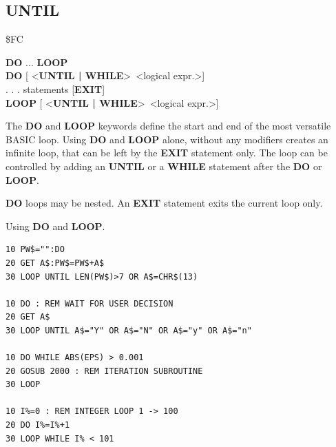 
\newpage
\subsection{UNTIL}
\begin{description}[leftmargin=2cm,style=nextline]
\item [Token:] \$FC
\item [Format:] {\bf DO} ... {\bf LOOP} \\
                {\bf DO} [ <{\bf UNTIL | WHILE}> <logical expr.>] \\
                . . . statements [{\bf EXIT}] \\
                {\bf LOOP} [ <{\bf UNTIL | WHILE}> <logical expr.>]
\item [Usage:] The {\bf DO} and {\bf LOOP} keywords define
               the start and end of the most versatile BASIC loop.
               Using {\bf DO} and {\bf LOOP} alone, without any
               modifiers creates an infinite loop, that can be left
               by the {\bf EXIT} statement only. The loop can be
               controlled by adding an {\bf UNTIL} or a {\bf WHILE}
               statement after the {\bf DO} or {\bf LOOP}.

\item [Remarks:] {\bf DO} loops may be nested. An {\bf EXIT} statement
               exits the current loop only.
\item [Example:] Using {\bf DO} and {\bf LOOP}.
\begin{tcolorbox}[colback=black,coltext=white]
\verbatimfont{\codefont}
\begin{verbatim}
10 PW$="":DO
20 GET A$:PW$=PW$+A$
30 LOOP UNTIL LEN(PW$)>7 OR A$=CHR$(13)

10 DO : REM WAIT FOR USER DECISION
20 GET A$
30 LOOP UNTIL A$="Y" OR A$="N" OR A$="y" OR A$="n"

10 DO WHILE ABS(EPS) > 0.001
20 GOSUB 2000 : REM ITERATION SUBROUTINE
30 LOOP

10 I%=0 : REM INTEGER LOOP 1 -> 100
20 DO I%=I%+1
30 LOOP WHILE I% < 101
\end{verbatim}
\end{tcolorbox}
\end{description}


\newpage
